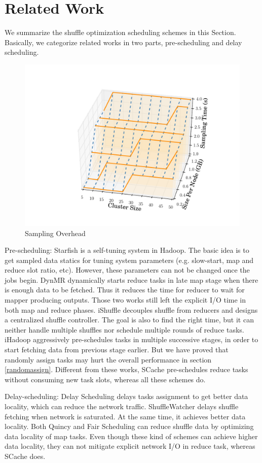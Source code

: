 \section{Related Work}
We summarize the shuffle optimization scheduling schemes in this Section. Basically, we categorize related works in two parts, pre-scheduling and delay scheduling.
\begin{figure}
	\centering
	\includegraphics[width=0.7\linewidth]{fig/sampling}
	\caption{Sampling Overhead}
	\label{fig:sampling}
\end{figure}
Pre-scheduling: Starfish \cite{starfish} is a self-tuning system in Hadoop. The basic idea is to get sampled data statics for tuning system parameters (e.g. slow-start, map and reduce slot ratio, etc). However, these parameters can not be changed once the jobs begin. DynMR \cite{dynmr} dynamically starts reduce tasks in late map stage when there is enough data to be fetched. Thus it reduces the time for reducer to wait for mapper producing outputs. Those two works still left the explicit I/O time in both map and reduce phases. iShuffle \cite{ishuffle} decouples shuffle from reducers and designs a centralized shuffle controller. The goal is also to find the right time, but it can neither handle multiple shuffles nor schedule multiple rounds of reduce tasks. iHadoop \cite{ihadoop} aggressively pre-schedules tasks in multiple successive stages, in order to start fetching data from previous stage earlier. But we have proved that randomly assign tasks may hurt the overall performance in section \ref{randomassign}. Different from these works, SCache pre-schedules reduce tasks without consuming new task slots, whereas all these schemes do.

Delay-scheduling: Delay Scheduling \cite{delay} delays tasks assignment to get better data locality, which can reduce the network traffic. ShuffleWatcher \cite{shufflewatcher} delays shuffle fetching when network is saturated. At the same time, it achieves better data locality. Both Quincy \cite{quincy} and Fair Scheduling \cite{preemptive} can reduce shuffle data by optimizing data locality of map tasks. Even though these kind of schemes can achieve higher data locality, they can not mitigate explicit network I/O in reduce task, whereas SCache does. 